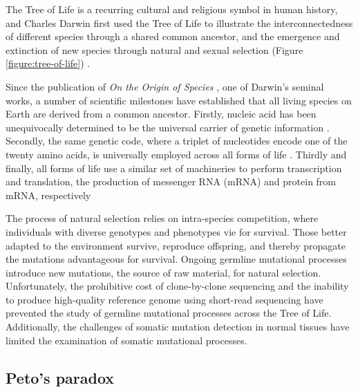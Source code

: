 The Tree of Life is a recurring cultural and religious symbol in human history, and Charles Darwin first used the Tree of Life to illustrate the interconnectedness of different species through a shared common ancestor, and the emergence and extinction of new species through natural and sexual selection (Figure \ref{figure:tree-of-life}) \cite{Darwin1859}. 

Since the publication of \textit{On the Origin of Species} \cite{Darwin1859}, one of Darwin's seminal works, a number of scientific milestones have established that all living species on Earth are derived from a common ancestor. Firstly, nucleic acid has been unequivocally determined to be the universal carrier of genetic information \cite{Avery1944-lr}. Secondly, the same genetic code, where a triplet of nucleotides encode one of the twenty amino acids, is universally employed across all forms of life \cite{Woese1968-lr}. Thirdly and finally, all forms of life use a similar set of machineries to perform transcription and translation, the production of messenger RNA (mRNA) and protein from mRNA, respectively \cite{}

The process of natural selection relies on intra-species competition, where individuals with diverse genotypes and phenotypes vie for survival. Those better adapted to the environment survive, reproduce offspring, and thereby propagate the mutations advantageous for survival. Ongoing germline mutational processes introduce new mutations, the source of raw material, for natural selection. Unfortunately, the prohibitive cost of clone-by-clone sequencing and the inability to produce high-quality reference genome using short-read sequencing have prevented the study of germline mutational processes across the Tree of Life. Additionally, the challenges of somatic mutation detection in normal tissues have limited the examination of somatic mutational processes. 

\subsection{Peto’s paradox}

